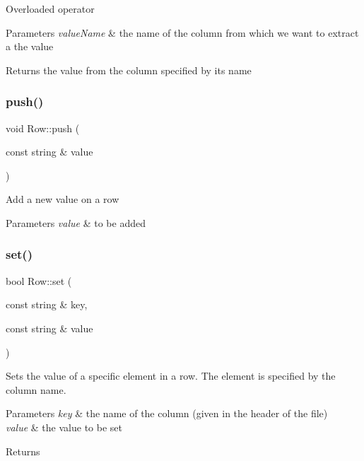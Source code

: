 Overloaded operator 
\begin{DoxyParams}{Parameters}
{\em value\+Name} & the name of the column from which we want to extract a the value \\
\hline
\end{DoxyParams}
\begin{DoxyReturn}{Returns}
the value from the column specified by its name 
\end{DoxyReturn}
\mbox{\label{class_row_ac18926c6dc8fdfb37894009a8c80fdb1}} 
\subsubsection{\texorpdfstring{push()}{push()}}
{\footnotesize\ttfamily void Row\+::push (\begin{DoxyParamCaption}\item[{const string \&}]{value }\end{DoxyParamCaption})}

Add a new value on a row 
\begin{DoxyParams}{Parameters}
{\em value} & to be added \\
\hline
\end{DoxyParams}
\mbox{\label{class_row_a74ab22cc8f79c7a1c87da8fefae0d834}} 
\subsubsection{\texorpdfstring{set()}{set()}}
{\footnotesize\ttfamily bool Row\+::set (\begin{DoxyParamCaption}\item[{const string \&}]{key,  }\item[{const string \&}]{value }\end{DoxyParamCaption})}

Sets the value of a specific element in a row. The element is specified by the column name. 
\begin{DoxyParams}{Parameters}
{\em key} & the name of the column (given in the header of the file) \\
\hline
{\em value} & the value to be set \\
\hline
\end{DoxyParams}
\begin{DoxyReturn}{Returns}

\end{DoxyReturn}
\mbox{\label{class_row_ac3dce6d0bd64e944a932a5a26c3ebcef}} 
